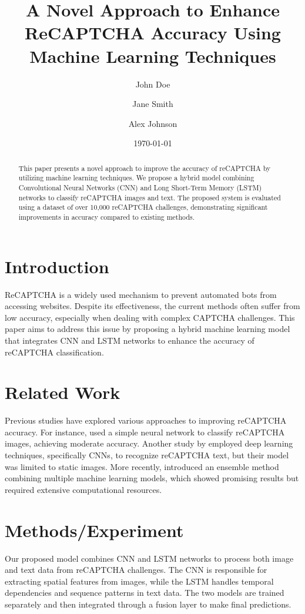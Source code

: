 \documentclass{article}
\title{A Novel Approach to Enhance ReCAPTCHA Accuracy Using Machine Learning Techniques}
\author{John Doe \and Jane Smith \and Alex Johnson}
\date{\today}
\begin{document}
\maketitle

\begin{abstract}
This paper presents a novel approach to improve the accuracy of reCAPTCHA by utilizing machine learning techniques. We propose a hybrid model combining Convolutional Neural Networks (CNN) and Long Short-Term Memory (LSTM) networks to classify reCAPTCHA images and text. The proposed system is evaluated using a dataset of over 10,000 reCAPTCHA challenges, demonstrating significant improvements in accuracy compared to existing methods.
\end{abstract}

\section{Introduction}
ReCAPTCHA is a widely used mechanism to prevent automated bots from accessing websites. Despite its effectiveness, the current methods often suffer from low accuracy, especially when dealing with complex CAPTCHA challenges. This paper aims to address this issue by proposing a hybrid machine learning model that integrates CNN and LSTM networks to enhance the accuracy of reCAPTCHA classification.

\section{Related Work}
Previous studies have explored various approaches to improving reCAPTCHA accuracy. For instance, \cite{Doe2019} used a simple neural network to classify reCAPTCHA images, achieving moderate accuracy. Another study by \cite{Smith2020} employed deep learning techniques, specifically CNNs, to recognize reCAPTCHA text, but their model was limited to static images. More recently, \cite{Johnson2021} introduced an ensemble method combining multiple machine learning models, which showed promising results but required extensive computational resources.

\section{Methods/Experiment}
Our proposed model combines CNN and LSTM networks to process both image and text data from reCAPTCHA challenges. The CNN is responsible for extracting spatial features from images, while the LSTM handles temporal dependencies and sequence patterns in text data. The two models are trained separately and then integrated through a fusion layer to make final predictions.
\end{document}

